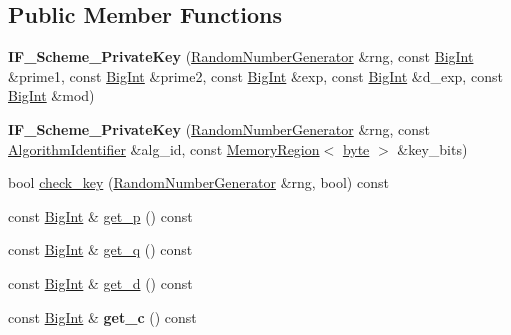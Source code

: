 \subsection*{Public Member Functions}
\begin{DoxyCompactItemize}
\item 
\hypertarget{classBotan_1_1IF__Scheme__PrivateKey_a650c479dbfb4456aca4b54ce2764ef48}{{\bfseries I\-F\-\_\-\-Scheme\-\_\-\-Private\-Key} (\hyperlink{classBotan_1_1RandomNumberGenerator}{Random\-Number\-Generator} \&rng, const \hyperlink{classBotan_1_1BigInt}{Big\-Int} \&prime1, const \hyperlink{classBotan_1_1BigInt}{Big\-Int} \&prime2, const \hyperlink{classBotan_1_1BigInt}{Big\-Int} \&exp, const \hyperlink{classBotan_1_1BigInt}{Big\-Int} \&d\-\_\-exp, const \hyperlink{classBotan_1_1BigInt}{Big\-Int} \&mod)}\label{classBotan_1_1IF__Scheme__PrivateKey_a650c479dbfb4456aca4b54ce2764ef48}

\item 
\hypertarget{classBotan_1_1IF__Scheme__PrivateKey_a62b64857ceb8bbb5a37ba2885982cd48}{{\bfseries I\-F\-\_\-\-Scheme\-\_\-\-Private\-Key} (\hyperlink{classBotan_1_1RandomNumberGenerator}{Random\-Number\-Generator} \&rng, const \hyperlink{classBotan_1_1AlgorithmIdentifier}{Algorithm\-Identifier} \&alg\-\_\-id, const \hyperlink{classBotan_1_1MemoryRegion}{Memory\-Region}$<$ \hyperlink{namespaceBotan_a7d793989d801281df48c6b19616b8b84}{byte} $>$ \&key\-\_\-bits)}\label{classBotan_1_1IF__Scheme__PrivateKey_a62b64857ceb8bbb5a37ba2885982cd48}

\item 
bool \hyperlink{classBotan_1_1IF__Scheme__PrivateKey_a42567a60cd7dd299e3f9781404f3203d}{check\-\_\-key} (\hyperlink{classBotan_1_1RandomNumberGenerator}{Random\-Number\-Generator} \&rng, bool) const 
\item 
const \hyperlink{classBotan_1_1BigInt}{Big\-Int} \& \hyperlink{classBotan_1_1IF__Scheme__PrivateKey_ad9c082126eb42eb90ccd8ca4c9312ec6}{get\-\_\-p} () const 
\item 
const \hyperlink{classBotan_1_1BigInt}{Big\-Int} \& \hyperlink{classBotan_1_1IF__Scheme__PrivateKey_ad54ac9c2c8d2715bfe7c9ad877ca0f47}{get\-\_\-q} () const 
\item 
const \hyperlink{classBotan_1_1BigInt}{Big\-Int} \& \hyperlink{classBotan_1_1IF__Scheme__PrivateKey_a140ae845dd9d8ed12d0423f3b1565052}{get\-\_\-d} () const 
\item 
\hypertarget{classBotan_1_1IF__Scheme__PrivateKey_a4c7d89bd2bfdf758912bbfb7f860b2c7}{const \hyperlink{classBotan_1_1BigInt}{Big\-Int} \& {\bfseries get\-\_\-c} () const }\label{classBotan_1_1IF__Scheme__PrivateKey_a4c7d89bd2bfdf758912bbfb7f860b2c7}


\end{DoxyCompactItemize}
